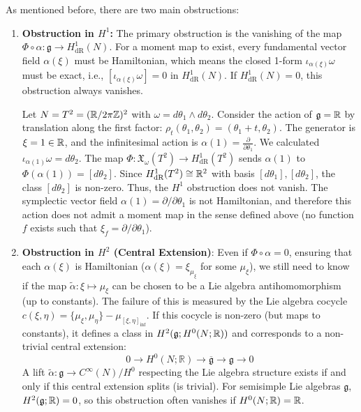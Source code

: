 \begin{remark}
\label{rem:moment_map_obstructions}
As mentioned before, there are two main obstructions:
\begin{enumerate}
    \item \textbf{Obstruction in $H^1$:} The primary obstruction is the vanishing of the map $\Phi \circ \alpha: \mathfrak{g}\to H^1_{\text{dR}}(N)$. For a moment map to exist, every fundamental vector field $\alpha(\xi)$ must be Hamiltonian, which means the closed 1-form $\iota_{\alpha(\xi)}\omega$ must be exact, i.e., $[\iota_{\alpha(\xi)}\omega] = 0$ in $H^1_{\text{dR}}(N)$. If $H^1_{\text{dR}}(N) = 0$, this obstruction always vanishes.

    \begin{example}
    Let $N=T^2 = (\mathbb{R}/2\pi\mathbb{Z})^2$ with $\omega = d\theta_1 \wedge d\theta_2$. Consider the action of $\mathfrak{g}= \mathbb{R}$ by translation along the first factor: $\rho_t(\theta_1, \theta_2) = (\theta_1+t, \theta_2)$. The generator is $\xi = 1 \in \mathbb{R}$, and the infinitesimal action is $\alpha(1) = \frac{\partial}{\partial\theta_1}$. We calculated $\iota_{\alpha(1)}\omega = d\theta_2$. The map $\Phi: \mathfrak{X}_{\omega}(T^2) \to H^1_{\text{dR}}(T^2)$ sends $\alpha(1)$ to $\Phi(\alpha(1)) = [d\theta_2]$. Since $H^1_{\text{dR}}(T^2) \cong \mathbb{R}^2$ with basis $[d\theta_1], [d\theta_2]$, the class $[d\theta_2]$ is non-zero. Thus, the $H^1$ obstruction does not vanish. The symplectic vector field $\alpha(1)=\partial/\partial\theta_1$ is not Hamiltonian, and therefore this action does not admit a moment map in the sense defined above (no function $f$ exists such that $\xi_f = \partial/\partial\theta_1$).
    \end{example}

    \item \textbf{Obstruction in $H^2$ (Central Extension)}: Even if $\Phi \circ \alpha = 0$, ensuring that each $\alpha(\xi)$ is Hamiltonian ($\alpha(\xi) = \xi_{\mu_\xi}$ for some $\mu_\xi$), we still need to know if the map $\tilde{\alpha}: \xi \mapsto \mu_\xi$ can be chosen to be a Lie algebra antihomomorphism (up to constants). The failure of this is measured by the Lie algebra cocycle $c(\xi, \eta) = \{\mu_\xi, \mu_\eta\} - \mu_{[\xi, \eta]_{\text{inf}}}$. If this cocycle is non-zero (but maps to constants), it defines a class in $H^2(\mathfrak{g}; H^0(N;\mathbb{R}))$ and corresponds to a non-trivial central extension:
    \[ 0 \longrightarrow H^0(N;\mathbb{R}) \longrightarrow \overline{\mathfrak{g}} \longrightarrow \mathfrak{g}\longrightarrow 0 \]
    A lift $\tilde{\alpha}: \mathfrak{g}\to C^\infty(N)/H^0$ respecting the Lie algebra structure exists if and only if this central extension splits (is trivial). For semisimple Lie algebras $\mathfrak{g}$, $H^2(\mathfrak{g}; \mathbb{R}) = 0$, so this obstruction often vanishes if $H^0(N;\mathbb{R})=\mathbb{R}$.
\end{enumerate}
\end{remark}

